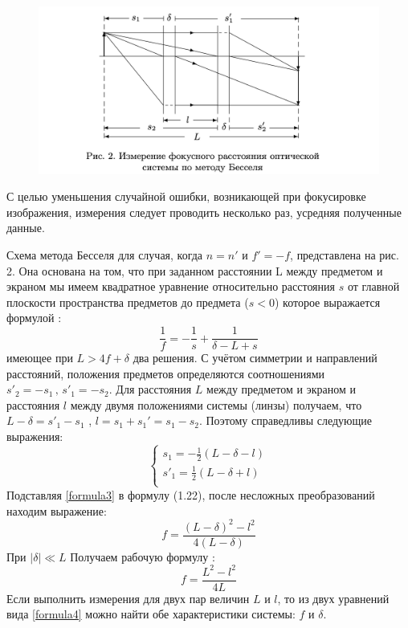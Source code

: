 \documentclass[a4paper,12pt]{article}
\begin{document}
\begin{center}
	\begin{figure}[bhtp!]
		\centering
	\includegraphics[width=15cm]{1.1.2.png}
	\end{figure}
\end{center}
С целью уменьшения случайной ошибки, возникающей при фокусировке изображения, измерения следует проводить несколько раз, усредняя полученные данные.

Схема метода Бесселя для случая, когда $n = n'$ и $f' = -f$, представлена на рис. 2. Она основана на том, что при заданном расстоянии L между предметом  и экраном мы имеем квадратное уравнение относительно расстояния $s$ от главной плоскости пространства предметов до предмета ($s < 0$) которое выражается формулой :
\begin{equation}\label{formula2}
	\frac{1}{f} = -\frac{1}{s} + \frac{1}{\delta - L +s}
\end{equation}
имеющее при  $L > 4f +\delta$ два решения. С учётом симметрии и направлений расстояний, положения предметов определяются соотношениями $s'_2 = -s_1\,,\,s'_1 = -s_2$. Для расстояния $L$ между предметом и экраном и расстояния $l$ между двумя положениями системы (линзы) получаем, что  $L-\delta = s'_1 - s_1$ , $l = s_1 + s_1' = s_1 -s_2$. Поэтому справедливы следующие выражения:
\begin{equation}\label{formula3}
	\begin{cases}
		s_1 = -\frac{1}{2}(L - \delta - l) \\
		s'_1 = \frac{1}{2}(L - \delta + l) \\
	\end{cases}
\end{equation}
Подставляя \eqref{formula3} в формулу (1.22), после несложных преобразований находим выражение: 
\begin{equation}\label{formula4}
	f = \frac{(L-\delta)^2 - l^2}{4(L-\delta)}
\end{equation}
При $|\delta| \ll L$  Получаем рабочую формулу : 
\begin{equation}\label{formula5}
	f = \frac{L^2- l^2}{4L}
\end{equation}
Если выполнить измерения для двух пар величин $L$ и $l$, то из двух уравнений вида  \eqref{formula4} можно найти обе характеристики системы: $f$ и $\delta$.
\newline\newline
\end{document}
